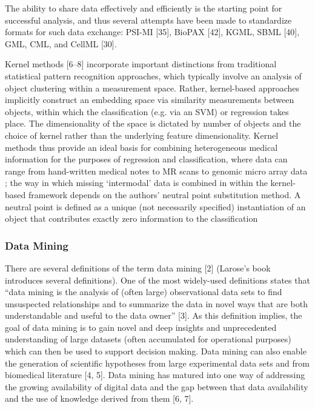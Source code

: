\documentclass[10pt,a4paper]{article}
\begin{document}
	The ability to share data effectively and efficiently is the starting point for successful
	analysis, and thus several attempts have been made to standardize formats for such
	data exchange: PSI-MI [35], BioPAX [42], KGML, SBML [40], GML, CML, and
	CellML [30]. \cite{Otasek2014}
	
	Kernel methods [6–8] incorporate important distinctions from traditional statistical
	pattern recognition approaches, which typically involve an analysis of
	object clustering within a measurement space. Rather, kernel-based approaches
	implicitly construct an embedding space via similarity measurements between
	objects, within which the classification (e.g. via an SVM) or regression takes
	place. The dimensionality of the space is dictated by number of objects and the
	choice of kernel rather than the underlying feature dimensionality.
	Kernel methods thus provide an ideal basis for combining heterogeneous medical
	information for the purposes of regression and classification, where data can
	range from hand-written medical notes to MR scans to genomic micro array data 
	; the way
	in which missing ‘intermodal’ data is combined in within the kernel-based framework
	depends on the authors’ neutral point substitution method. A neutral point
	is defined as a unique (not necessarily specified) instantiation of an object that
	contributes exactly zero information to the classification \cite{Windridge2014}
	
	\subsubsection{Data Mining}	
	There are several definitions of the term data mining [2] (Larose’s book introduces several definitions). One of the most widely-used definitions states that “data mining is the analysis of (often large) observational data sets to find unsuspected relationships and to summarize the data in novel ways that are both understandable and useful to the data owner” [3]. As this definition implies, the goal of data mining is to gain novel and deep insights and unprecedented understanding of large datasets (often accumulated for operational purposes) which can then be used to support decision making. Data mining can also enable the generation of scientific hypotheses from large experimental data sets and from biomedical literature [4, 5]. Data mining has matured into one way of addressing the growing availability of digital data and the gap between that data availability and the use of knowledge derived from them [6, 7]. \cite{Yoo2012}
	
\end{document}
